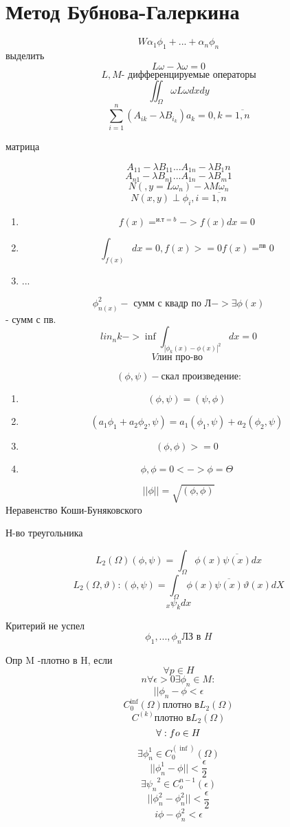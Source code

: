 \documentclass{article}
\begin{document}
\section{Метод Бубнова-Галеркина}

\[ W \alpha_1 \phi_1 + ... + \alpha_n \phi_n\]
выделить \[ L \omega - \lambda \omega = 0 \]
\[ L, M  \textrm{- дифференцируемые операторы} \]
\[ \iint_{\Omega}^{} \omega L \omega dx dy \]
\[ \sum_{i=1}^{n} (A_{ik} - \lambda B_{i_k}) a_k = 0, k = \overline{1,n} \]

матрица

\[ A_{11} - \lambda B_{11} ... A_{1n} - \lambda B_1n \]
\[ A_{n1} - \lambda B_{n1} ... A_{1n} - \lambda B_m1 \]
\[ N (,y = L \omega_n) - \lambda M \omega_n \]
\[ N(x,y) \perp \phi_i, i = \overline{1,n}\]

\begin{enumerate}
	\item \[ f(x) =^{\textrm{и.т} = b} -> f(x) dx = 0 \]
	\item \[ \int_{ f(x)}^{} dx =0, f(x) >= 0  f(x) =^\textrm{пв} 0  \] 
	\item ...
\end{enumerate}

\[ \phi_{n(x)}^2 -\textrm{ сумм с квадр по Л}  -> \exists \phi (x)  \] - сумм с пв.
\[ lin _nk-> \inf \int_{{|\phi _k (x) - \phi (x)|}^2}^{} dx = 0\]
\[ V \textrm{лин про-во } \]

\[ (\phi , \psi) - \textrm{скал произведение:} \]

\begin{enumerate}
	\item\[  (\phi, \psi) = (\psi, \phi) \]
	\item \[ (a_1 \phi_1 + a_2 \phi_2, \psi) = a_1 (\phi_1, \psi) + a_2 (\phi_2, \psi) \]
	\item \[ (\phi , \phi) >= 0 \]
	\item \[ \phi, \phi = 0 <-> \phi = \Theta\]
\end{enumerate}
\[ || \phi || = \sqrt{(\phi, \phi)} \]
Неравенство Коши-Буняковского 

Н-во треугольника

\[ L_2(\Omega) (\phi, \psi) = \int_{\Omega}^{} \phi(x) \overline{\psi(x)}dx \]
\[ L_2(\Omega , \vartheta): (\phi, \psi) = \int_{\Omega}^{} \phi(x) \overline{\psi(x)}\vartheta (x) dX\]
\[ _x \psi_k dx \]

Критерий не успел
\[ \phi_1, ..., \phi_n \textrm{ЛЗ в }H \]

Опр M -плотно в H, если \[ \forall p \in H \]
\[ n \forall \epsilon >0 \exists \phi_n \in M: \]
\[|| \phi_n - \phi < \epsilon \]
\[ C_0^{\inf} (\Omega) \textrm{плотно в} L_2(\Omega) \]
\[ C^{(k)}\textrm{плотно в} L_2(\Omega) \]
\[ \forall : \\fo \in H \]
\[ \exists \phi_n^1 \in C_0^{(\inf)}(\Omega) \]
\[ ||\phi_n^1 - \phi|| < \frac{\epsilon}{2} \]
\[ \exists {\psi_n}^2 \in C_o^{n-1} (\epsilon) \]
\[ || \phi^2_n - \phi_n^2 || < \frac{\epsilon }{2}\]
\[ i\phi - \phi^2_n < \epsilon \]
\end{document}
